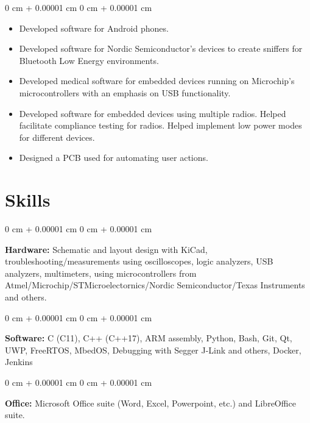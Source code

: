 \documentclass{article}
\newenvironment{highlights}{
    \begin{itemize}[
        topsep=0.10 cm,
        parsep=0.10 cm,
        partopsep=0pt,
        itemsep=0pt,
        leftmargin=0 cm + 10pt
    ]
}{
    \end{itemize}
}
\newenvironment{onecolentry}{
    \begin{adjustwidth}{
        0 cm + 0.00001 cm
    }{
        0 cm + 0.00001 cm
    }
}{
    \end{adjustwidth}
}
\begin{document}
    \vspace{0.1 cm}
    \begin{onecolentry}
      \begin{highlights}
        \item Developed software for Android phones.
        \item Developed software for Nordic Semiconductor's devices to create sniffers for Bluetooth Low Energy environments.
        \item Developed medical software for embedded devices running on Microchip's microcontrollers with an emphasis on USB functionality.
        \item Developed software for embedded devices using multiple radios. Helped facilitate compliance testing for radios. Helped implement low power modes for different devices.
        \item Designed a PCB used for automating user actions.
      \end{highlights}
    \end{onecolentry}
  \section{Skills}
    \begin{onecolentry}
      \textbf{Hardware:} Schematic and layout design with KiCad, troubleshooting/measurements using oscilloscopes, logic analyzers, USB analyzers, multimeters, using microcontrollers from Atmel/Microchip/STMicroelectornics/Nordic Semiconductor/Texas Instruments and others.
    \end{onecolentry}
    \vspace{0.3 cm}
    \begin{onecolentry}
      \textbf{Software:} C (C11), C++ (C++17), ARM assembly, Python, Bash, Git, Qt, UWP, FreeRTOS, MbedOS, Debugging with Segger J-Link and others, Docker, Jenkins
    \end{onecolentry}
    \vspace{0.3 cm}
    \begin{onecolentry}
      \textbf{Office:} Microsoft Office suite (Word, Excel, Powerpoint, etc.) and LibreOffice suite.
    \end{onecolentry}
  \newpage
\end{document}
